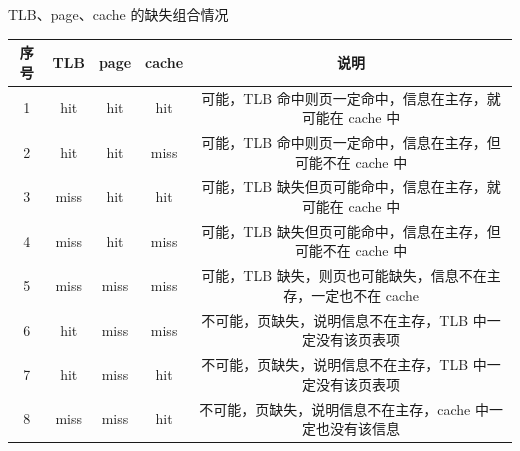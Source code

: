 \documentclass[cs4size,a4paper,10pt]{ctexart}
\begin{document}
		TLB、page、cache 的缺失组合情况
		\begin{table}[H]
			\centering
			\begin{tabular}{|c|c|c|c|c|}
				\hline
				序号 & TLB  & page & cache & 说明                                   \\ \hline
				1  & hit  & hit  & hit   & 可能，TLB 命中则页一定命中，信息在主存，就可能在 cache 中   \\ \hline
				2  & hit  & hit  & miss  & 可能，TLB 命中则页一定命中，信息在主存，但可能不在 cache 中  \\ \hline
				3  & miss & hit  & hit   & 可能，TLB 缺失但页可能命中，信息在主存，就可能在 cache 中   \\ \hline
				4  & miss & hit  & miss  & 可能，TLB 缺失但页可能命中，信息在主存，但可能不在 cache 中  \\ \hline
				5  & miss & miss & miss  & 可能，TLB 缺失，则页也可能缺失，信息不在主存，一定也不在 cache \\ \hline
				6  & hit  & miss & miss  & 不可能，页缺失，说明信息不在主存，TLB 中一定没有该页表项       \\ \hline
				7  & hit  & miss & hit   & 不可能，页缺失，说明信息不在主存，TLB 中一定没有该页表项       \\ \hline
				8  & miss & miss & hit   & 不可能，页缺失，说明信息不在主存，cache 中一定也没有该信息     \\ \hline 
			\end{tabular}
		\end{table}
\end{document}
